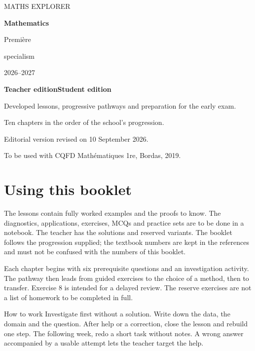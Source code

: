 \begin{titlepage}
\color{bleu}\sffamily
{\large MATHS EXPLORER\par}
\vspace{22mm}
{\fontsize{35}{40}\selectfont\bfseries Mathematics\par}
\vspace{6mm}
{\LARGE Première\par specialism\par}
\vspace{12mm}
{\Large 2026--2027\par}
\vspace{10mm}
\vfill
{\Large\bfseries\ifprof Teacher edition\else Student edition\fi\par}
\vspace{4mm}
Developed lessons, progressive pathways and preparation for the early exam.\par
Ten chapters in the order of the school's progression.\par
\vspace{8mm}
{\small Editorial version revised on 10 September 2026.\par To be used with CQFD Mathématiques 1re, Bordas, 2019.}
\end{titlepage}
\chapter*{Using this booklet}
The lessons contain fully worked examples and the proofs to know. The diagnostics, applications, exercises, MCQs and practice sets are to be done in a notebook. The teacher has the solutions and reserved variants. The booklet follows the progression supplied; the textbook numbers are kept in the references and must not be confused with the numbers of this booklet.

Each chapter begins with six prerequisite questions and an investigation activity. The pathway then leads from guided exercises to the choice of a method, then to transfer. Exercise 8 is intended for a delayed review. The reserve exercises are not a list of homework to be completed in full.

\begin{repere}{How to work}
Investigate first without a solution. Write down the data, the domain and the question. After help or a correction, close the lesson and rebuild one step. The following week, redo a short task without notes. A wrong answer accompanied by a usable attempt lets the teacher target the help.
\end{repere}

